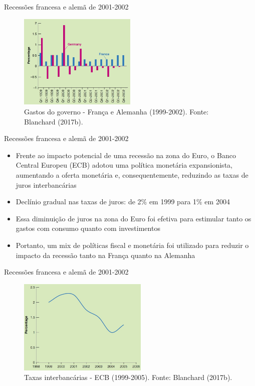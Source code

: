 \documentclass[10pt]{beamer}
\begin{document}
\begin{frame}{Recessões francesa e alemã de 2001-2002}
\begin{figure}
    \centering
    \includegraphics[width=0.5\textwidth]{./figures/aula082_fig9.JPG}
    \caption{Gastos do governo - França e Alemanha (1999-2002). Fonte: Blanchard (2017b).}
    \label{fig3}
\end{figure}
\end{frame}

\begin{frame}{Recessões francesa e alemã de 2001-2002}
\begin{itemize}
    \item Frente ao impacto potencial de uma recessão na zona do Euro, o Banco Central Europeu (ECB) adotou uma política monetária expansionista, aumentando a oferta monetária e, consequentemente, reduzindo as taxas de juros interbancárias
    \bigskip
    \item Declínio gradual nas taxas de juros: de 2\% em 1999 para 1\% em 2004
    \bigskip
    \item Essa diminuição de juros na zona do Euro foi efetiva para estimular tanto os gastos com consumo quanto com investimentos
    \bigskip
    \item Portanto, um mix de políticas fiscal e monetária foi utilizado para reduzir o impacto da recessão tanto na França quanto na Alemanha
\end{itemize}
\end{frame}

\begin{frame}{Recessões francesa e alemã de 2001-2002}
\begin{figure}
    \centering
    \includegraphics[width=0.55\textwidth]{./figures/aula082_fig10.JPG}
    \caption{Taxas interbancárias - ECB (1999-2005). Fonte: Blanchard (2017b).}
    \label{fig4}
\end{figure}
\end{frame}
\end{document}
